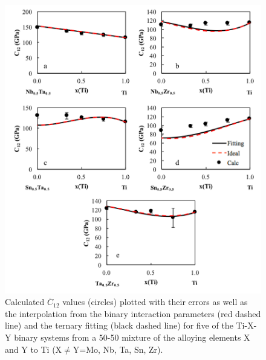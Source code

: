 \pagebreak
\begin{figure}[H]
	\centering
	\includegraphics[width=\textwidth]{Chapter-6/Figures/tixyc12_2.png}
	\caption{Calculated $\overline{C}_{12}$ values (circles) plotted with their errors as well as the interpolation from the binary interaction parameters (red dashed line) and the ternary fitting (black dashed line) for five of the Ti-X-Y binary systems from a 50-50 mixture of the alloying elements X and Y to Ti (X$\neq$Y=Mo, Nb, Ta, Sn, Zr).}
	\label{Ch6-figure:tixyc12_2}
\end{figure}

